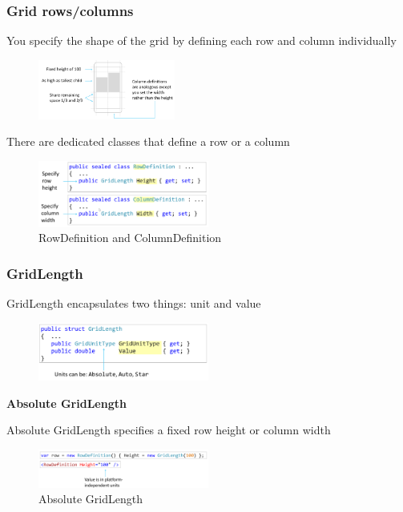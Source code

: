 \documentclass{article}
\newcommand{\bold}[1]{\textbf{#1}}
\begin{document}
\subsubsection{Grid rows/columns}

You specify the shape of the grid by defining each row and column individually

\begin{figure}[H]
    \centering
    \includegraphics[width=0.4\textwidth]{xaml-grid2.png}
    \caption{}
\end{figure}

There are dedicated classes that define a row or a column

\begin{figure}[H]
    \centering
    \includegraphics[width=0.5\textwidth]{xaml-grid-rowcol.png}
    \caption{RowDefinition and ColumnDefinition}
\end{figure}

\subsubsection{GridLength}

GridLength encapsulates two things: unit and value

\begin{figure}[H]
    \centering
    \includegraphics[width=0.5\textwidth]{xaml-grid-length.png}
    \caption{}
\end{figure}

\bold{Absolute GridLength}

Absolute GridLength specifies a fixed row height or column width

\begin{figure}[H]
    \centering
    \includegraphics[width=0.5\textwidth]{xaml-grid-length-abs.png}
    \caption{Absolute GridLength}
\end{figure}
\end{document}
